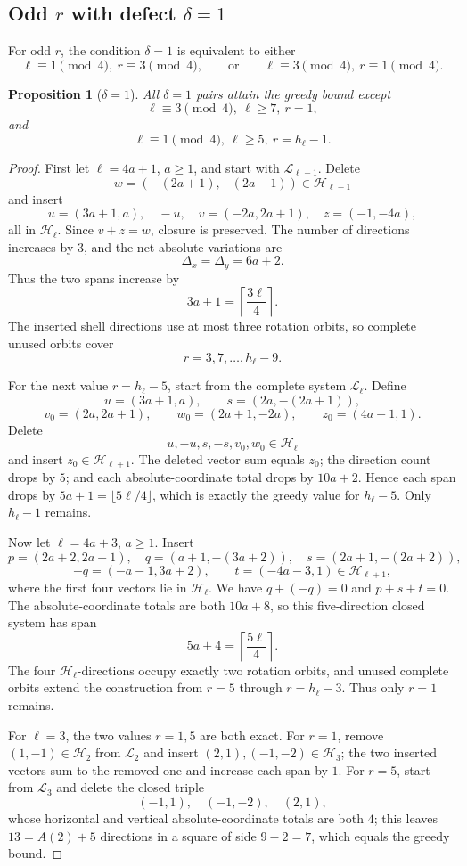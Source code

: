 \documentclass[11pt]{article}
\newtheorem{proposition}[theorem]{Proposition}
\theoremstyle{definition}
\newcommand{\HH}{\mathcal H}
\newcommand{\LL}{\mathcal L}
\begin{document}
\subsection{Odd \(r\) with defect \(\delta=1\)}

For odd \(r\), the condition \(\delta=1\) is equivalent to either
\[
\ell\equiv1\pmod4,\ r\equiv3\pmod4,
\qquad\text{or}\qquad
\ell\equiv3\pmod4,\ r\equiv1\pmod4.
\]

\begin{proposition}[\(\delta=1\)]\label{prop:delta1}
All \(\delta=1\) pairs attain the greedy bound except
\[
\ell\equiv3\pmod4,\ \ell\ge7,\ r=1,
\]
and
\[
\ell\equiv1\pmod4,\ \ell\ge5,\ r=h_\ell-1.
\]
\end{proposition}

\begin{proof}
First let \(\ell=4a+1\), \(a\ge1\), and start with \(\LL_{\ell-1}\).  Delete
\[
w=(-(2a+1),-(2a-1))\in\HH_{\ell-1}
\]
and insert
\[
u=(3a+1,a),\quad -u,\quad
v=(-2a,2a+1),\quad z=(-1,-4a),
\]
all in \(\HH_\ell\).  Since \(v+z=w\), closure is preserved.  The number of directions increases by \(3\), and the net absolute variations are
\[
\Delta_x=\Delta_y=6a+2.
\]
Thus the two spans increase by
\[
3a+1=\left\lceil\frac{3\ell}{4}\right\rceil.
\]
The inserted shell directions use at most three rotation orbits, so complete unused orbits cover
\[
r=3,7,\ldots,h_\ell-9.
\]

For the next value \(r=h_\ell-5\), start from the complete system \(\LL_\ell\).  Define
\[
u=(3a+1,a),\qquad s=(2a,-(2a+1)),
\]
\[
v_0=(2a,2a+1),\qquad w_0=(2a+1,-2a),
\qquad z_0=(4a+1,1).
\]
Delete
\[
u,-u,s,-s,v_0,w_0\in\HH_\ell
\]
and insert \(z_0\in\HH_{\ell+1}\).  The deleted vector sum equals \(z_0\); the direction count drops by \(5\); and each absolute-coordinate total drops by \(10a+2\).  Hence each span drops by \(5a+1=\lfloor5\ell/4\rfloor\), which is exactly the greedy value for \(h_\ell-5\).  Only \(h_\ell-1\) remains.

Now let \(\ell=4a+3\), \(a\ge1\).  Insert
\[
p=(2a+2,2a+1),\quad
q=(a+1,-(3a+2)),\quad
s=(2a+1,-(2a+2)),
\]
\[
-q=(-a-1,3a+2),\qquad
t=(-4a-3,1)\in\HH_{\ell+1},
\]
where the first four vectors lie in \(\HH_\ell\).  We have
\(q+(-q)=0\) and \(p+s+t=0\).  The absolute-coordinate totals are both
\(10a+8\), so this five-direction closed system has span
\[
5a+4=\left\lceil\frac{5\ell}{4}\right\rceil.
\]
The four \(\HH_\ell\)-directions occupy exactly two rotation orbits, and unused complete orbits extend the construction from \(r=5\) through \(r=h_\ell-3\).  Thus only \(r=1\) remains.

For \(\ell=3\), the two values \(r=1,5\) are both exact.  For \(r=1\), remove
\((1,-1)\in\HH_2\) from \(\LL_2\) and insert
\((2,1),(-1,-2)\in\HH_3\); the two inserted vectors sum to the removed one and increase each span by \(1\).  For \(r=5\), start from \(\LL_3\) and delete the closed triple
\[
(-1,1),\quad(-1,-2),\quad(2,1),
\]
whose horizontal and vertical absolute-coordinate totals are both \(4\); this leaves \(13=A(2)+5\) directions in a square of side \(9-2=7\), which equals the greedy bound.
\end{proof}
\end{document}
